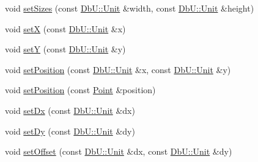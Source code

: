 \begin{DoxyCompactItemize}
\item 
void \hyperlink{classHurricane_1_1Contact_aa18aa1e78eba9f4c10ece0e20683faf5}{set\-Sizes} (const \hyperlink{group__DbUGroup_ga4fbfa3e8c89347af76c9628ea06c4146}{Db\-U\-::\-Unit} \&width, const \hyperlink{group__DbUGroup_ga4fbfa3e8c89347af76c9628ea06c4146}{Db\-U\-::\-Unit} \&height)
\item 
void \hyperlink{classHurricane_1_1Contact_a181436f128b65467e1ab94ffcb0c345b}{set\-X} (const \hyperlink{group__DbUGroup_ga4fbfa3e8c89347af76c9628ea06c4146}{Db\-U\-::\-Unit} \&x)
\item 
void \hyperlink{classHurricane_1_1Contact_a455b8925aae10157c9143b58a3a52e57}{set\-Y} (const \hyperlink{group__DbUGroup_ga4fbfa3e8c89347af76c9628ea06c4146}{Db\-U\-::\-Unit} \&y)
\item 
void \hyperlink{classHurricane_1_1Contact_afac88ee8442e3e943a24bb526057851a}{set\-Position} (const \hyperlink{group__DbUGroup_ga4fbfa3e8c89347af76c9628ea06c4146}{Db\-U\-::\-Unit} \&x, const \hyperlink{group__DbUGroup_ga4fbfa3e8c89347af76c9628ea06c4146}{Db\-U\-::\-Unit} \&y)
\item 
void \hyperlink{classHurricane_1_1Contact_ad3ff25d47d1c00c53bb07bb0ff4067f1}{set\-Position} (const \hyperlink{classHurricane_1_1Point}{Point} \&position)
\item 
void \hyperlink{classHurricane_1_1Contact_a6ee60b9d228fe5487bf73dc396b94706}{set\-Dx} (const \hyperlink{group__DbUGroup_ga4fbfa3e8c89347af76c9628ea06c4146}{Db\-U\-::\-Unit} \&dx)
\item 
void \hyperlink{classHurricane_1_1Contact_a32ee96c21115ee9d197bc505fd48e37d}{set\-Dy} (const \hyperlink{group__DbUGroup_ga4fbfa3e8c89347af76c9628ea06c4146}{Db\-U\-::\-Unit} \&dy)
\item 
void \hyperlink{classHurricane_1_1Contact_a41ba972136e77d768f58ad0407d18f8e}{set\-Offset} (const \hyperlink{group__DbUGroup_ga4fbfa3e8c89347af76c9628ea06c4146}{Db\-U\-::\-Unit} \&dx, const \hyperlink{group__DbUGroup_ga4fbfa3e8c89347af76c9628ea06c4146}{Db\-U\-::\-Unit} \&dy)
\end{DoxyCompactItemize}
